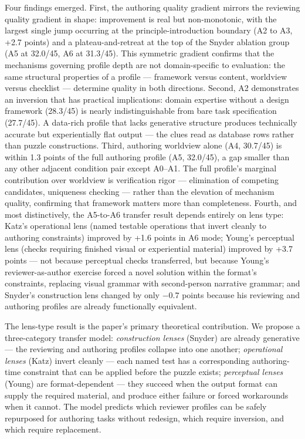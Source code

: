 Four findings emerged. First, the authoring quality gradient mirrors the reviewing quality gradient in shape: improvement is real but non-monotonic, with the largest single jump occurring at the principle-introduction boundary (A2 to A3, +2.7 points) and a plateau-and-retreat at the top of the Snyder ablation group (A5 at 32.0/45, A6 at 31.3/45). This symmetric gradient confirms that the mechanisms governing profile depth are not domain-specific to evaluation: the same structural properties of a profile — framework versus content, worldview versus checklist — determine quality in both directions. Second, A2 demonstrates an inversion that has practical implications: domain expertise without a design framework (28.3/45) is nearly indistinguishable from bare task specification (27.7/45). A data-rich profile that lacks generative structure produces technically accurate but experientially flat output — the clues read as database rows rather than puzzle constructions. Third, authoring worldview alone (A4, 30.7/45) is within 1.3 points of the full authoring profile (A5, 32.0/45), a gap smaller than any other adjacent condition pair except A0–A1. The full profile's marginal contribution over worldview is verification rigor — elimination of competing candidates, uniqueness checking — rather than the elevation of mechanism quality, confirming that framework matters more than completeness. Fourth, and most distinctively, the A5-to-A6 transfer result depends entirely on lens type: Katz's operational lens (named testable operations that invert cleanly to authoring constraints) improved by +1.6 points in A6 mode; Young's perceptual lens (checks requiring finished visual or experiential material) improved by +3.7 points — not because perceptual checks transferred, but because Young's reviewer-as-author exercise forced a novel solution within the format's constraints, replacing visual grammar with second-person narrative grammar; and Snyder's construction lens changed by only $-0.7$ points because his reviewing and authoring profiles are already functionally equivalent.

The lens-type result is the paper's primary theoretical contribution. We propose a three-category transfer model: \emph{construction lenses} (Snyder) are already generative — the reviewing and authoring profiles collapse into one another; \emph{operational lenses} (Katz) invert cleanly — each named test has a corresponding authoring-time constraint that can be applied before the puzzle exists; \emph{perceptual lenses} (Young) are format-dependent — they succeed when the output format can supply the required material, and produce either failure or forced workarounds when it cannot. The model predicts which reviewer profiles can be safely repurposed for authoring tasks without redesign, which require inversion, and which require replacement.

